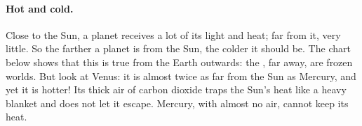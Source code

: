 \paragraph{Hot and cold.} Close to the Sun, a planet receives a lot of its
light and heat; far from it, very little. So the farther a planet is from
the Sun, the colder it should be. The chart below shows that this is true
from the Earth outwards: the , far away, are frozen worlds.
But look at Venus: it is almost twice as far from the Sun as Mercury, and
yet it is hotter! Its thick air of carbon dioxide traps the Sun's heat like
a heavy blanket and does not let it escape. Mercury, with almost no air,
cannot keep its heat.

